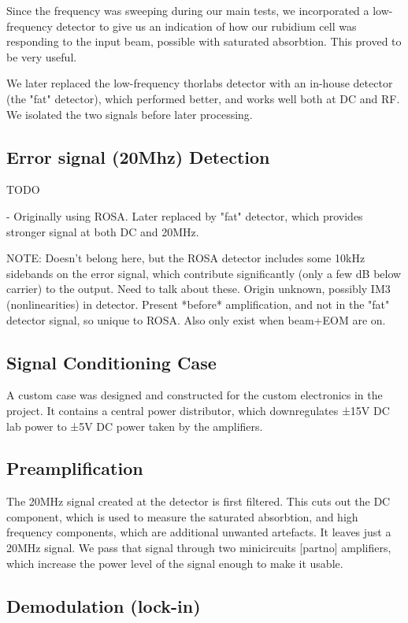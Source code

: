 Since the frequency was sweeping during our main tests, we incorporated a low-frequency detector to give us an indication of how our rubidium cell was responding to the input beam, possible with saturated absorbtion.  This proved to be very useful.

We later replaced the low-frequency thorlabs detector with an in-house detector (the "fat" detector), which performed better, and works well both at DC and RF.  We isolated the two signals before later processing.

\subsection{Error signal (20Mhz) Detection}

TODO

- Originally using ROSA.  Later replaced by "fat" detector, which provides stronger signal at both DC and 20MHz.

NOTE: Doesn't belong here, but the ROSA detector includes some 10kHz sidebands on the error signal, which contribute significantly (only a few dB below carrier) to the output.  Need to talk about these.  Origin unknown, possibly IM3 (nonlinearities) in detector.  Present *before* amplification, and not in the "fat" detector signal, so unique to ROSA.  Also only exist when beam+EOM are on.

\subsection{Signal Conditioning Case}

A custom case was designed and constructed for the custom electronics in the project.  It contains a central power distributor, which downregulates ±15V DC lab power to ±5V DC power taken by the amplifiers.

\subsection{Preamplification}

The 20MHz signal created at the detector is first filtered.  This cuts out the DC component, which is used to measure the saturated absorbtion, and high frequency components, which are additional unwanted artefacts.  It leaves just a 20MHz signal.  We pass that signal through two minicircuits [partno] amplifiers, which increase the power level of the signal enough to make it usable.

\subsection{Demodulation (lock-in)}

